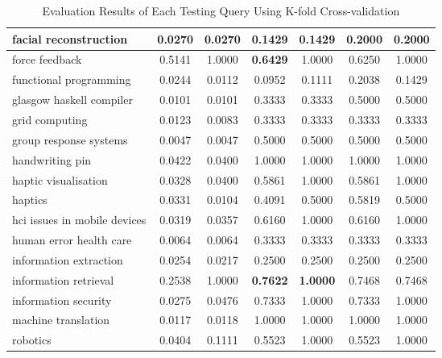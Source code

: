 \begin{table}
{\begin{tabular}{|l|c|c|c|c|c|c|}
\hline facial reconstruction & 0.0270 & 0.0270 & 0.1429 & 0.1429 & 0.2000 & 0.2000 \\
\hline force feedback & 0.5141 & 1.0000 & \textbf{0.6429} & 1.0000 & 0.6250 & 1.0000 \\
\hline functional programming & 0.0244 & 0.0112 & 0.0952 & 0.1111 & 0.2038 & 0.1429 \\
\hline glasgow haskell compiler & 0.0101 & 0.0101 & 0.3333 & 0.3333 & 0.5000 & 0.5000 \\
\hline grid computing & 0.0123 & 0.0083 & 0.3333 & 0.3333 & 0.3333 & 0.3333 \\
\hline group response systems & 0.0047 & 0.0047 & 0.5000 & 0.5000 & 0.5000 & 0.5000 \\
\hline handwriting pin & 0.0422 & 0.0400 & 1.0000 & 1.0000 & 1.0000 & 1.0000 \\
\hline haptic visualisation & 0.0328 & 0.0400 & 0.5861 & 1.0000 & 0.5861 & 1.0000 \\
\hline haptics & 0.0331 & 0.0104 & 0.4091 & 0.5000 & 0.5819 & 0.5000 \\
\hline hci issues in mobile devices & 0.0319 & 0.0357 & 0.6160 & 1.0000 & 0.6160 & 1.0000 \\
\hline human error health care & 0.0064 & 0.0064 & 0.3333 & 0.3333 & 0.3333 & 0.3333 \\
\hline information extraction & 0.0254 & 0.0217 & 0.2500 & 0.2500 & 0.2500 & 0.2500 \\
\hline information retrieval & 0.2538 & 1.0000 & \textbf{0.7622} & \textbf{1.0000} & 0.7468 & 0.7468 \\
\hline information security & 0.0275 & 0.0476 & 0.7333 & 1.0000 & 0.7333 & 1.0000 \\
\hline machine translation & 0.0117 & 0.0118 & 1.0000 & 1.0000 & 1.0000 & 1.0000 \\
\hline robotics & 0.0404 & 0.1111 & 0.5523 & 1.0000 & 0.5523 & 1.0000 \\
\hline
\end{tabular}
}
\caption{Evaluation Results of Each Testing Query Using K-fold Cross-validation} \label{table:kfoldqueryresult}
\end{table}



